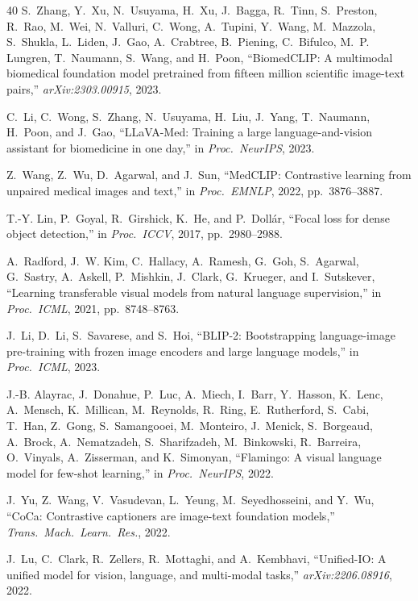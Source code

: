 \documentclass[conference]{IEEEtran}
\begin{document}
\begin{thebibliography}{40}
S.~Zhang, Y.~Xu, N.~Usuyama, H.~Xu, J.~Bagga, R.~Tinn, S.~Preston,
R.~Rao, M.~Wei, N.~Valluri, C.~Wong, A.~Tupini, Y.~Wang, M.~Mazzola,
S.~Shukla, L.~Liden, J.~Gao, A.~Crabtree, B.~Piening, C.~Bifulco,
M.~P. Lungren, T.~Naumann, S.~Wang, and H.~Poon,
``BiomedCLIP: A multimodal biomedical foundation model pretrained from
fifteen million scientific image-text pairs,'' \emph{arXiv:2303.00915}, 2023.

C.~Li, C.~Wong, S.~Zhang, N.~Usuyama, H.~Liu, J.~Yang, T.~Naumann,
H.~Poon, and J.~Gao,
``LLaVA-Med: Training a large language-and-vision assistant for biomedicine in one day,''
in \emph{Proc.\ NeurIPS}, 2023.

Z.~Wang, Z.~Wu, D.~Agarwal, and J.~Sun,
``MedCLIP: Contrastive learning from unpaired medical images and text,''
in \emph{Proc.\ EMNLP}, 2022, pp.\ 3876--3887.

T.-Y. Lin, P.~Goyal, R.~Girshick, K.~He, and P.~Doll{\'a}r,
``Focal loss for dense object detection,''
in \emph{Proc.\ ICCV}, 2017, pp.\ 2980--2988.

A.~Radford, J.~W. Kim, C.~Hallacy, A.~Ramesh, G.~Goh, S.~Agarwal,
G.~Sastry, A.~Askell, P.~Mishkin, J.~Clark, G.~Krueger, and I.~Sutskever,
``Learning transferable visual models from natural language supervision,''
in \emph{Proc.\ ICML}, 2021, pp.\ 8748--8763.

J.~Li, D.~Li, S.~Savarese, and S.~Hoi,
``BLIP-2: Bootstrapping language-image pre-training with frozen image
encoders and large language models,'' in \emph{Proc.\ ICML}, 2023.

J.-B. Alayrac, J.~Donahue, P.~Luc, A.~Miech, I.~Barr, Y.~Hasson,
K.~Lenc, A.~Mensch, K.~Millican, M.~Reynolds, R.~Ring, E.~Rutherford,
S.~Cabi, T.~Han, Z.~Gong, S.~Samangooei, M.~Monteiro, J.~Menick,
S.~Borgeaud, A.~Brock, A.~Nematzadeh, S.~Sharifzadeh, M.~Binkowski,
R.~Barreira, O.~Vinyals, A.~Zisserman, and K.~Simonyan,
``Flamingo: A visual language model for few-shot learning,''
in \emph{Proc.\ NeurIPS}, 2022.

J.~Yu, Z.~Wang, V.~Vasudevan, L.~Yeung, M.~Seyedhosseini, and Y.~Wu,
``CoCa: Contrastive captioners are image-text foundation models,''
\emph{Trans.\ Mach.\ Learn.\ Res.}, 2022.

J.~Lu, C.~Clark, R.~Zellers, R.~Mottaghi, and A.~Kembhavi,
``Unified-IO: A unified model for vision, language, and multi-modal tasks,''
\emph{arXiv:2206.08916}, 2022.


\end{thebibliography}
\end{document}
